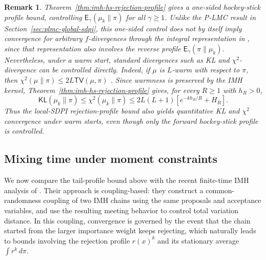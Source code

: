 \documentclass[10pt, journal]{IEEEtran}
\makeatletter
\def\eqref#1{equation~\ref{#1}}
\renewcommand{\eqref}[1]{\textup{\tagform@{\ref{#1}}}}
\newcommand{\TV}{\mathsf{TV}}
\newtheorem{remark}{Remark}
\makeatother
\begin{document}


\begin{remark}\label{rem:imh-kl-chi} Theorem~\ref{thm:imh-hs-rejection-profile} gives a one-sided hockey-stick profile bound, controlling $\mathsf E_\gamma(\mu_k\|\pi)$ for all $\gamma\ge1$. Unlike the P-LMC result in Section~\ref{sec:plmc-global-sdpi}, this one-sided control does not by itself imply convergence for arbitrary $f$-divergences through the integral representation in \eqref{f_representation}, since that representation also involves the reverse profile $\mathsf E_\gamma(\pi\|\mu_k)$. Nevertheless, under a warm start, standard divergences such as KL and $\chi^2$-divergence can be controlled directly. Indeed, if $\mu$ is $L$-warm with respect to $\pi$, then $\chi^2(\mu\|\pi)\le 2L\TV(\mu,\pi)$ \cite[Lemma~28]{chewi2021optimal}. Since warmness is preserved by the IMH kernel, Theorem~\ref{thm:imh-hs-rejection-profile} gives, for every $R\ge1$ with $h_R>0$, $$\mathsf{KL}(\mu_k\|\pi)\le \chi^2(\mu_k\|\pi)\le 2L(L+1)\left[e^{-kh_R/R}+H_R\right].$$ Thus the local-SDPI rejection-profile bound also yields quantitative KL and $\chi^2$ convergence under warm starts, even though only the forward hockey-stick profile is controlled. \end{remark}

\subsection{Mixing time under moment constraints}
\label{subsec:imh-moment-tail}

We now compare the tail-profile bound above with the recent finite-time IMH analysis of \cite{deligiannidis2024importance}. Their approach is coupling-based: they construct a common-randomness coupling of two IMH chains using the same proposals and acceptance variables, and use the resulting meeting behavior to control total variation distance. In this coupling, convergence is governed by the event that the chain started from the larger importance weight keeps rejecting, which naturally leads to bounds involving the rejection profile $r(x)^k$ and its stationary average $\int r^k\,d\pi$. 
\end{document}
